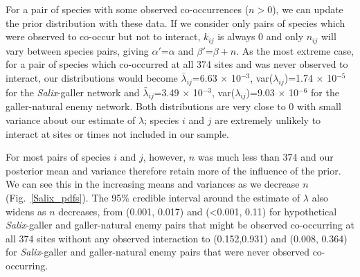 \documentclass[12pt]{article}
\begin{document}
\begin{spacing}{2.0}
      For a pair of species with some observed co-occurrences ($n>0$), we can update the prior distribution with these data. If we consider only pairs of species which were observed to co-occur but not to interact, $k_{ij}$ is always 0 and only $n_{ij}$ will vary between species pairs, giving $\alpha'$=$\alpha$ and $\beta'$=$\beta + n$. As the most extreme case, for a pair of species which co-occurred at all 374 sites and was never observed to interact, our distributions would become 
      $\bar\lambda_{ij}$=6.63 $\times$ 10$^{-3}$, var($\lambda_{ij}$)=1.74 $\times$ 10$^{-5}$ for the \emph{Salix}-galler network and 
      $\bar\lambda_{ij}$=3.49 $\times$ 10$^{-3}$, var($\lambda_{ij}$)=9.03 $\times$ 10$^{-6}$ for the galler-natural enemy network. Both distributions are very close to 0 with small variance about our estimate of $\lambda$; species $i$ and $j$ are extremely unlikely to interact at sites or times not included in our sample.


      For most pairs of species $i$ and $j$, however, $n$ was much less than 374 and our posterior mean and variance therefore retain more of the influence of the prior. We can see this in the increasing means and variances as we decrease $n$ (Fig.~\ref{Salix_pdfs}). The 95\% credible interval around the estimate of $\lambda$ also widens as $n$ decreases, from (0.001, 0.017) and (\textless0.001, 0.11) for hypothetical \emph{Salix}-galler and galler-natural enemy pairs that might be observed co-occurring at all 374 sites without any observed interaction to (0.152,0.931) and (0.008, 0.364) for \emph{Salix}-galler and galler-natural enemy pairs that were never observed co-occurring.





\end{spacing}
\end{document}
